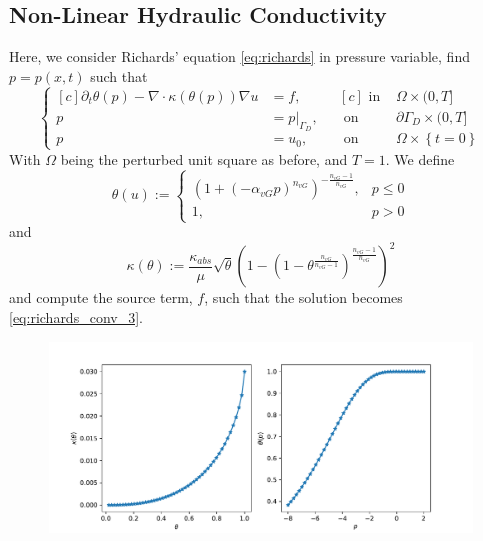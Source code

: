 \documentclass[../Main/main.tex]{subfiles}
\begin{document}
	\subsection{Non-Linear Hydraulic Conductivity}
	Here, we consider Richards' equation \eqref{eq:richards} in pressure variable, find $p=p(x,t)$ such that
	\begin{equation}
	\left \{
	\begin{aligned}[c]
		\partial_t \theta(p) - \nabla \cdot \kappa(\theta(p))\nabla u &= f, \\
		p &= p|_{\Gamma_D}, \\
		p &= u_0,
	\end{aligned}
	\ \ \
	\begin{aligned}[c]
		\text{ in }& \Omega \times (0,T]\\
		\text{ on }& \partial \Gamma_D \times (0,T]\\
		\text{ on }& \Omega \times \left\{t=0\right \}
	\end{aligned}
	\right.
	\end{equation}
	With $\Omega$ being the perturbed unit square as before, and $T=1$. We define 
	\begin{equation}
			\theta(u):=\left\{\begin{matrix}
				(1+(-\alpha_{vG}p)^{n_{vG}})^{-\frac{n_{vG}-1}{n_{vG}}},&p\leq 0 \\ 
				1,&p>0 
			\end{matrix}\right.
	\end{equation}
and
\begin{equation}
	\kappa(\theta):=
		\frac{\kappa_{abs}}{\mu}\sqrt{\theta}\left(1-\left(1-\theta^{\frac{n_{vG}}{n_{vG}-1}}\right)^{\frac{n_{vG}-1}{n_{vG}}}\right)^2
\end{equation}
	and compute the source term, $f$, such that the solution becomes \eqref{eq:richards_conv_3}.
	\begin{figure}
		\centering
		\includegraphics[width=1.1\textwidth]{van.pdf}	
	\end{figure}
\end{document}
